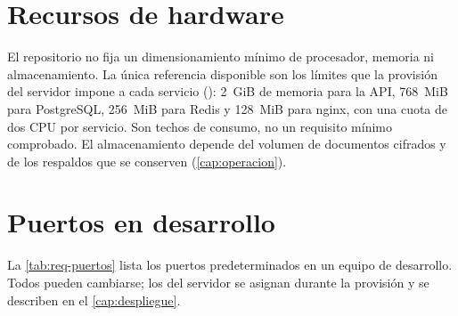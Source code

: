 
\section{Recursos de hardware}\label{sec:req-hardware}

El repositorio no fija un dimensionamiento mínimo de procesador, memoria ni
almacenamiento. La única referencia disponible son los límites que la
provisión del servidor impone a cada servicio
(): 2~GiB de memoria para la API, 768~MiB para
PostgreSQL, 256~MiB para Redis y 128~MiB para nginx, con una cuota de dos
CPU por servicio. Son techos de consumo, no un requisito mínimo comprobado.
El almacenamiento depende del volumen de documentos cifrados y de los
respaldos que se conserven (\cref{cap:operacion}).

\section{Puertos en desarrollo}\label{sec:req-puertos}

La \cref{tab:req-puertos} lista los puertos predeterminados en un equipo de
desarrollo. Todos pueden cambiarse; los del servidor se asignan durante la
provisión y se describen en el \cref{cap:despliegue}.

